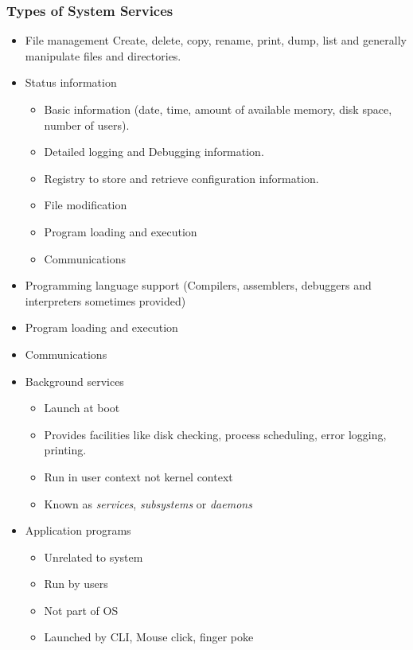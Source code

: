 \documentclass[]{article}
\begin{document}
\subsubsection*{Types of System Services}
\begin{itemize}
    \item File management
        \subitem Create, delete, copy, rename, print, dump, list and generally manipulate files and directories.
    \item Status information
    \begin{itemize}
        \item Basic information (date, time, amount of available memory, disk space, number of users).
        \item Detailed logging and Debugging information.
        \item Registry to store and retrieve configuration information.
        \item File modification
        \item Program loading and execution
        \item Communications
    \end{itemize}
    \item Programming language support (Compilers, assemblers, debuggers and interpreters sometimes provided)
    \item Program loading and execution
    \item Communications
    \item Background services
    \begin{itemize}
        \item Launch at boot
        \item Provides facilities like disk checking, process scheduling, error logging, printing.
        \item Run in user context not kernel context
        \item Known as \emph{services}, \emph{subsystems} or \emph{daemons}
    \end{itemize}
    \item Application programs
    \begin{itemize}
        \item Unrelated to system
        \item Run by users
        \item Not part of OS
        \item Launched by CLI, Mouse click, finger poke
    \end{itemize}
\end{itemize}
\end{document}

